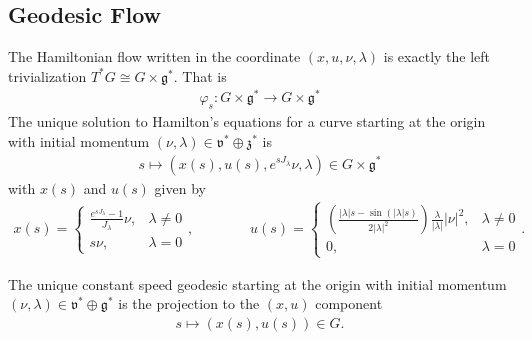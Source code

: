 \documentclass[11pt]{amsart}
\theoremstyle{plain}
\theoremstyle{definition}
\theoremstyle{remark}
\numberwithin{equation}{section}
\def\fz{\mathfrak{z}}
\def\fg{\mathfrak{g}}
\def\fv{\mathfrak{v}}
\numberwithin{equation}{section}
\begin{document}
\subsection{Geodesic Flow}

The  Hamiltonian flow written in the coordinate $(x, u, \nu, \lambda)$ is exactly the left trivialization $T^*G\cong G\times \fg^*$. That is
\begin{align*}
	\varphi_s: G\times \fg^*\to G\times \fg^*
\end{align*}
The unique solution to Hamilton's equations for a curve starting at the origin with initial momentum $(\nu, \lambda)\in \fv^*\oplus\fz^*$  is
\begin{align*}
	s\mapsto \left(x(s), u(s), e^{sJ_\lambda}\nu, \lambda\right)\in G\times \fg^*
\end{align*}
with $x(s)$ and $u(s)$ given by
\begin{align}\label{geodesics}
	x(s)=
	\begin{cases}
		\frac{e^{sJ_\lambda}-1}{J_\lambda}{\nu}, & \lambda\neq 0\\
		s{\nu}, & \lambda=0
	\end{cases}, \qquad \qquad
	u(s)=
	\begin{cases}
		\left(\frac{|\lambda|s-\sin{(|\lambda|s)}}{2|\lambda|^2}\right)\frac{\lambda}{|\lambda|}|{\nu}|^2, & \lambda\neq 0 \\
		0, & \lambda=0
	\end{cases}.
\end{align}


The unique constant speed geodesic starting at the origin with initial momentum $(\nu, \lambda)\in \fv^*\oplus\fg^*$ is the projection to the $(x, u)$ component
\begin{align}
	s\mapsto (x(s), u(s)) \in G.\label{geodesic}
\end{align}
\end{document}
